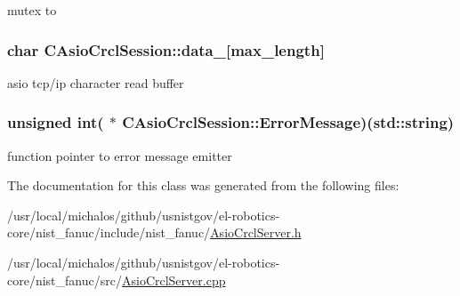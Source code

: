 mutex to \hypertarget{classCAsioCrclSession_a1326999cd8dde70d8d69a4243ccba767}{
\subsubsection[{data\-\_\-}]{\setlength{\rightskip}{0pt plus 5cm}char C\-Asio\-Crcl\-Session\-::data\-\_\-\mbox{[}{\bf max\-\_\-length}\mbox{]}\hspace{0.3cm}{\ttfamily [protected]}}}\label{classCAsioCrclSession_a1326999cd8dde70d8d69a4243ccba767}
asio tcp/ip character read buffer \hypertarget{classCAsioCrclSession_a1bd7e2c7fd02f1445f000248d908d069}{
\subsubsection[{Error\-Message}]{\setlength{\rightskip}{0pt plus 5cm}unsigned int( $\ast$ C\-Asio\-Crcl\-Session\-::\-Error\-Message)(std\-::string)\hspace{0.3cm}{\ttfamily [protected]}}}\label{classCAsioCrclSession_a1bd7e2c7fd02f1445f000248d908d069}
function pointer to error message emitter 

The documentation for this class was generated from the following files\-:\begin{DoxyCompactItemize}
\item 
/usr/local/michalos/github/usnistgov/el-\/robotics-\/core/nist\-\_\-fanuc/include/nist\-\_\-fanuc/\hyperlink{AsioCrclServer_8h}{Asio\-Crcl\-Server.\-h}\item 
/usr/local/michalos/github/usnistgov/el-\/robotics-\/core/nist\-\_\-fanuc/src/\hyperlink{AsioCrclServer_8cpp}{Asio\-Crcl\-Server.\-cpp}\end{DoxyCompactItemize}
